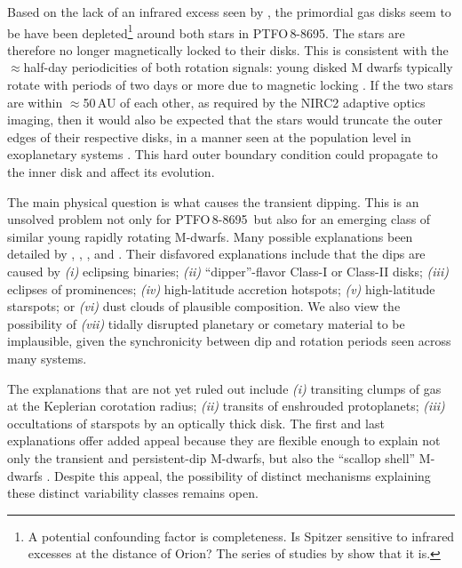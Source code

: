 \documentclass[12pt,twocolumn,tighten]{aastex62}
\newcommand{\ptfo}{PTFO$\,$8-8695}
\begin{document}
Based on the lack of an infrared excess seen by \citet{yu_tests_2015},
the primordial gas disks seem to be have been depleted\footnote{A
potential confounding factor is completeness. Is Spitzer sensitive to
infrared excesses at the distance of Orion? The series of studies by
\cite{hernandez_spitzer_2006,hernandez_spitzer_ob1_2007,hernandez_spitzer_sig_2007,hernandez_spitzer_2009}
show that it is.} around both stars in \ptfo. The stars are therefore
no longer magnetically locked to their disks.  This is consistent with
the $\approx$half-day periodicities of both rotation signals: young
disked M dwarfs typically rotate with periods of two days or more due
to magnetic locking \citep[{\it e.g.},][]{rebull_rotation_2020}.  If
the two stars are within $\approx$50$\,$AU of each other, as required
by the NIRC2 adaptive optics imaging, then it would also be expected
that the stars would truncate the outer edges of their respective
disks, in a manner seen at the population level in exoplanetary
systems \citep{kraus_impact_2016,moe_impact_2019}.  This hard outer
boundary condition could propagate to the inner disk and affect its
evolution.

The main physical question is what causes the
transient dipping. This is an unsolved problem not only for \ptfo\ but
also for an emerging class of similar young rapidly rotating M-dwarfs.
Many possible explanations been detailed by \citet{rebull_rotation_2016}, \citet{david_transient_2017},
\citet{stauffer_orbiting_2017}, and \citet{zhan_complex_2019}.
Their disfavored explanations include that the dips are caused by
{\it (i)} eclipsing binaries;
{\it (ii)} ``dipper''-flavor Class-I or Class-II disks;
{\it (iii)} eclipses of prominences;
{\it (iv)} high-latitude accretion hotspots;
{\it (v)} high-latitude starspots;
or
{\it (vi)} dust clouds of plausible composition.
We also view the possibility of {\it (vii)} tidally disrupted planetary
or cometary material to be implausible, given the synchronicity
between dip and rotation periods seen across many systems.

The explanations that are not yet ruled out include
{\it (i)} transiting clumps of gas at the Keplerian corotation radius;
{\it (ii)} transits of enshrouded protoplanets;
{\it (iii)} occultations of starspots by an optically thick disk.
The first and last explanations offer added appeal because they are
flexible enough to explain not only the transient and persistent-dip
M-dwarfs, but also the ``scallop shell'' M-dwarfs
\citep{stauffer_orbiting_2017}.
Despite this appeal, the possibility of distinct mechanisms explaining
these distinct variability classes remains open.
\end{document}
